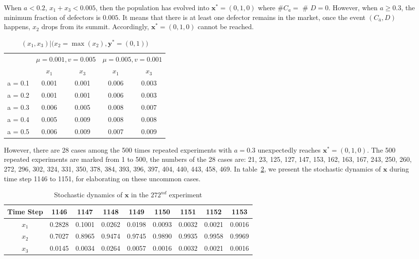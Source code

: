 \documentclass[letterpaper,10pt]{article}
\numberwithin{equation}{section}
\begin{document}
When $ a < 0.2 $, $ x_{1} + x_{3} < 0.005 $, then the population has evolved into $ \mathbf{x}^* = (0, 1, 0) $ where \#$ C_{a} = $ \# $ D = 0 $. However, when $ a \geq 0.3 $, the minimum fraction of defectors is $ 0.005 $. It means that there is at least one defector remains in the market, once the event $ (C_{\bar{a}}, D) $ happens, $ x_{2} $ drops from its summit. Accordingly, $ \mathbf{x}^*= (0,1,0) $ cannot be reached.

\begin{table}[H]
\centering
    \caption{$ (x_{1},x_{3}) | \bigl(x_{2} = \max(x_{2}), \mathbf{y}^* = (0,1)\bigr) $}
    \label{Table: X|maxX2}
    \begin{tabular}{l|cccc}
        \hline
                & \multicolumn{2}{c}{$ \mu = 0.001, v = 0.005 $} & \multicolumn{2}{c}{$ \mu = 0.005, v = 0.001 $} \\ \cline{2-5} 
                & $ x_{1} $ & $ x_{3} $ & $ x_{1} $ & $ x_{3} $ \\ \hline
        a = 0.1 & 0.001     & 0.001     & 0.006     & 0.003    \\
        a = 0.2 & 0.001     & 0.001     & 0.006     & 0.003    \\
        a = 0.3 & 0.006     & 0.005     & 0.008     & 0.007    \\
        a = 0.4 & 0.005     & 0.009     & 0.008     & 0.008    \\
        a = 0.5 & 0.006     & 0.009     & 0.007     & 0.009    \\
        \hline
    \end{tabular}
\end{table}

However, there are 28 cases among the 500 times repeated experiments with $ a = 0.3 $ unexpectedly reaches $ \mathbf{x}^*=(0,1,0) $. The 500 repeated experiments are marked from 1 to 500, the numbers of the 28 cases are: 21, 23, 125, 127, 147, 153, 162, 163, 167, 243, 250, 260, 272, 296, 302, 324, 331, 350, 378, 384, 393, 396, 397, 404, 440, 443, 458, 469. In table~\ref{Table: x272}, we present the stochastic dynamics of $ \mathbf{x} $ during time step 1146 to 1151, for elaborating on these uncommon cases.

\begin{table}[h]
    \centering
    \caption{Stochastic dynamics of $ \mathbf{x} $ in the $ 272^{nd} $ experiment}
    \label{Table: x272}
    \begin{tabular}{c|cccccccc}
    \hline
        Time Step & 1146   & 1147   & 1148   & 1149   & 1150   & 1151   & 1152   & 1153   \\ \hline
        $ x_{1} $ & 0.2828 & 0.1001 & 0.0262 & 0.0198 & 0.0093 & 0.0032 & 0.0021 & 0.0016 \\
        $ x_{2} $ & 0.7027 & 0.8965 & 0.9474 & 0.9745 & 0.9890 & 0.9935 & 0.9958 & 0.9969 \\
        $ x_{3} $ & 0.0145 & 0.0034 & 0.0264 & 0.0057 & 0.0016 & 0.0032 & 0.0021 & 0.0016 \\ \hline
    \end{tabular}
\end{table}
\end{document}
